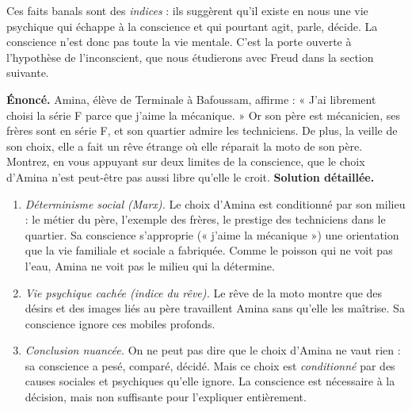 \documentclass[11pt]{article}
\newcommand{\cle}[1]{{\popxbold\color{popdark}#1}}
\begin{document}
Ces faits banals sont des \emph{indices} : ils suggèrent qu'il existe en nous une vie psychique qui échappe à la conscience et qui pourtant agit, parle, décide. La conscience n'est donc pas toute la vie mentale. C'est la porte ouverte à l'hypothèse de l'\cle{inconscient}, que nous étudierons avec Freud dans la section suivante.

\begin{exoresolu}
\textbf{Énoncé.} Amina, élève de Terminale à Bafoussam, affirme : « J'ai librement choisi la série F parce que j'aime la mécanique. » Or son père est mécanicien, ses frères sont en série F, et son quartier admire les techniciens. De plus, la veille de son choix, elle a fait un rêve étrange où elle réparait la moto de son père. Montrez, en vous appuyant sur deux limites de la conscience, que le choix d'Amina n'est peut-être pas aussi libre qu'elle le croit.
\tcblower
\textbf{Solution détaillée.}
\begin{enumerate}
\item \emph{Déterminisme social (Marx).} Le choix d'Amina est conditionné par son milieu : le métier du père, l'exemple des frères, le prestige des techniciens dans le quartier. Sa conscience s'approprie (« j'aime la mécanique ») une orientation que la vie familiale et sociale a fabriquée. Comme le poisson qui ne voit pas l'eau, Amina ne voit pas le milieu qui la détermine.
\item \emph{Vie psychique cachée (indice du rêve).} Le rêve de la moto montre que des désirs et des images liés au père travaillent Amina sans qu'elle les maîtrise. Sa conscience ignore ces mobiles profonds.
\item \emph{Conclusion nuancée.} On ne peut pas dire que le choix d'Amina ne vaut rien : sa conscience a pesé, comparé, décidé. Mais ce choix est \emph{conditionné} par des causes sociales et psychiques qu'elle ignore. La conscience est nécessaire à la décision, mais non suffisante pour l'expliquer entièrement.
\end{enumerate}
\end{exoresolu}
\end{document}
